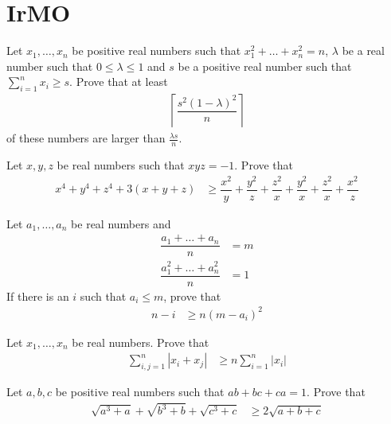 \documentclass[inequalities.tex]{subfile}
\begin{document}
	\section{IrMO}\label{sec:irmo}
	
		\begin{problem}
			Let $x_{1},\ldots,x_{n}$ be positive real numbers such that $x_{1}^{2}+\ldots+x_{n}^{2}=n$, $\lambda$ be a real number such that $0\leq \lambda\leq 1$ and $s$ be a positive real number such that $\sum_{i=1}^{n}x_{i}\geq s$. Prove that at least
				\begin{align*}
					\left\lceil\dfrac{s^{2}(1-\lambda)^{2}}{n}\right\rceil
				\end{align*}
			of these numbers are larger than $\frac{\lambda s}{n}$.
		\end{problem}
	
		\begin{problem}
			Let $x,y,z$ be real numbers such that $xyz=-1$. Prove that
				\begin{align*}
					x^{4}+y^{4}+z^{4}+3(x+y+z)
						& \geq \dfrac{x^{2}}{y}+\dfrac{y^{2}}{z}+\dfrac{z^{2}}{x}+\dfrac{y^{2}}{x}+\dfrac{z^{2}}{x}+\dfrac{x^{2}}{z}
				\end{align*}
		\end{problem}
	
		\begin{problem}
			Let $a_{1},\ldots,a_{n}$ be real numbers and
				\begin{align*}
					\dfrac{a_{1}+\ldots+a_{n}}{n}
						& = m\\
					\dfrac{a_{1}^{2}+\ldots+a_{n}^{2}}{n}
						& = 1
				\end{align*}
			If there is an $i$ such that $a_{i}\leq m$, prove that
				\begin{align*}
					n-i
						& \geq n(m-a_{i})^{2}
				\end{align*}
		\end{problem}
	
		\begin{problem}
			Let $x_{1},\ldots,x_{n}$ be real numbers. Prove that
				\begin{align*}
					\sum_{i,j=1}^{n}|x_{i}+x_{j}|
						& \geq n\sum_{i=1}^{n}|x_{i}|
				\end{align*}
		\end{problem}
	
		\begin{problem}
			Let $a,b,c$ be positive real numbers such that $ab+bc+ca=1$. Prove that
				\begin{align*}
					\sqrt{a^{3}+a}+\sqrt{b^{3}+b}+\sqrt{c^{3}+c}
						& \geq 2\sqrt{a+b+c}
				\end{align*}
		\end{problem}
	
\end{document}
